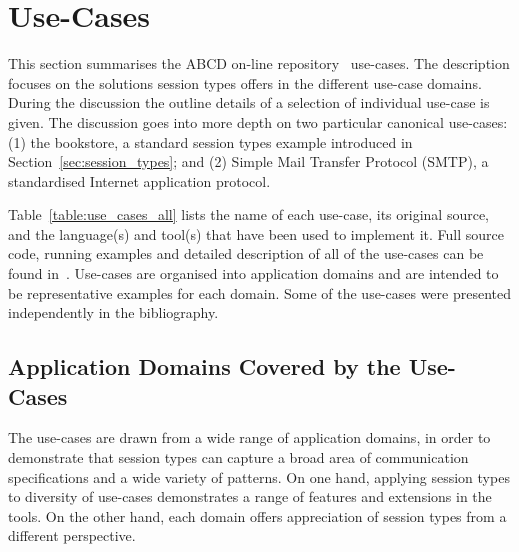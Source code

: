 
\section{Use-Cases}
\label{sec:usecases}

This section summarises the ABCD on-line
repository~\cite{usecase_repository} use-cases.
The description focuses on the
solutions session types offers in the different 
use-case domains. During the discussion
the outline details of a selection of individual
use-case is given. The discussion goes
into more depth on two particular canonical
use-cases:
(1) the bookstore, a standard session types example introduced
in Section~\ref{sec:session_types};
and
(2) Simple Mail Transfer Protocol (SMTP),
a standardised Internet application protocol.

Table~\ref{table:use_cases_all} lists the name of each use-case,
its original source, and the language(s) and tool(s) that have been
used to implement it. Full source code, running examples and detailed
description of all of the use-cases can be found in~\cite{usecase_repository}. 
Use-cases are organised into application domains and are intended
to be representative examples for each domain. Some of the use-cases
were presented independently in the bibliography.

\subsection{Application Domains Covered by the Use-Cases}

The use-cases are drawn from a wide range of
application domains, in order to demonstrate that
session types can capture a broad area of communication
specifications and a wide variety of patterns.
On  one hand, applying session types to diversity of use-cases
demonstrates a range of features and extensions in the tools. 
%
On the other  hand, each domain offers appreciation
of session types from a different perspective.


